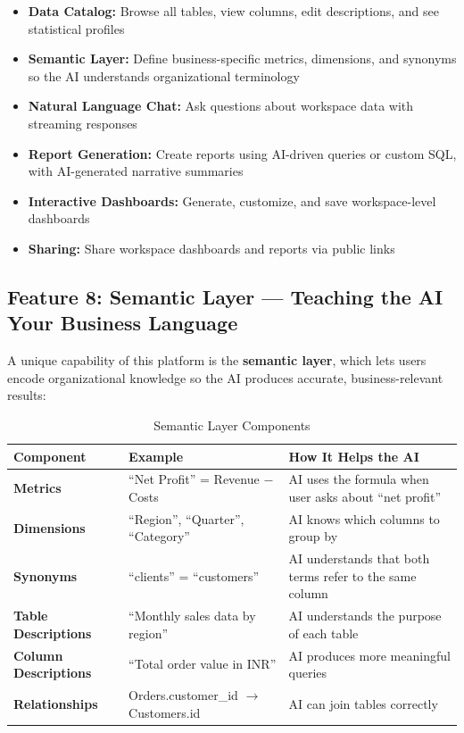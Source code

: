 \documentclass[12pt,a4paper]{report}
\begin{document}
\begin{itemize}[leftmargin=1.5cm]
    \item \textbf{Data Catalog:} Browse all tables, view columns, edit descriptions, and see statistical profiles
    \item \textbf{Semantic Layer:} Define business-specific metrics, dimensions, and synonyms so the AI understands organizational terminology
    \item \textbf{Natural Language Chat:} Ask questions about workspace data with streaming responses
    \item \textbf{Report Generation:} Create reports using AI-driven queries or custom SQL, with AI-generated narrative summaries
    \item \textbf{Interactive Dashboards:} Generate, customize, and save workspace-level dashboards
    \item \textbf{Sharing:} Share workspace dashboards and reports via public links
\end{itemize}

\subsection{Feature 8: Semantic Layer --- Teaching the AI Your Business Language}

A unique capability of this platform is the \textbf{semantic layer}, which lets users encode organizational knowledge so the AI produces accurate, business-relevant results:

\begin{table}[H]
\centering
\caption{Semantic Layer Components}
\begin{tabular}{>{\bfseries}p{3cm} p{4cm} p{5.5cm}}
\toprule
\textbf{Component} & \textbf{Example} & \textbf{How It Helps the AI} \\
\midrule
Metrics & ``Net Profit'' = Revenue $-$ Costs & AI uses the formula when user asks about ``net profit'' \\
Dimensions & ``Region'', ``Quarter'', ``Category'' & AI knows which columns to group by \\
Synonyms & ``clients'' = ``customers'' & AI understands that both terms refer to the same column \\
Table Descriptions & ``Monthly sales data by region'' & AI understands the purpose of each table \\
Column Descriptions & ``Total order value in INR'' & AI produces more meaningful queries \\
Relationships & Orders.customer\_id $\rightarrow$ Customers.id & AI can join tables correctly \\
\bottomrule
\end{tabular}
\label{tab:semantic}
\end{table}
\end{document}
